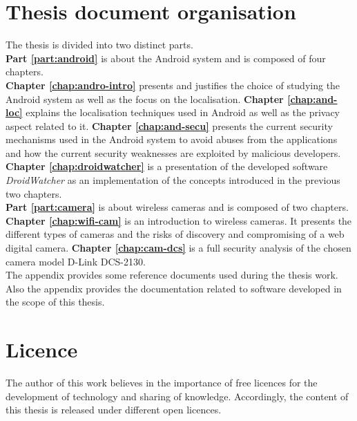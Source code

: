 \section{Thesis document organisation}

The thesis is divided into two distinct parts.\\

\textbf{Part \ref{part:android}} is about the Android system and is composed of four chapters.\\

\textbf{Chapter \ref{chap:andro-intro}} presents and justifies the choice of studying the Android system as well as the focus on the localisation.
\textbf{Chapter \ref{chap:and-loc}} explains the localisation techniques used in Android as well as the privacy aspect related to it.
\textbf{Chapter \ref{chap:and-secu}} presents the current security mechanisms used in the Android system to avoid abuses from the applications and how the current security weaknesses are exploited by malicious developers.
\textbf{Chapter \ref{chap:droidwatcher}} is a presentation of the developed software \emph{DroidWatcher} as an implementation of the concepts introduced in the previous two chapters.\\

\textbf{Part \ref{part:camera}} is about wireless cameras and is composed of two chapters.\\

\textbf{Chapter \ref{chap:wifi-cam}} is an introduction to wireless cameras.
It presents the different types of cameras and the risks of discovery and compromising of a web digital camera.
\textbf{Chapter \ref{chap:cam-dcs}} is a full security analysis of the chosen camera model D-Link DCS-2130.\\

The appendix provides some reference documents used during the thesis work.
Also the appendix provides the documentation related to software developed in the scope of this thesis.

\section{Licence}

The author of this work believes in the importance of free licences for the development of technology and sharing of knowledge.
Accordingly, the content of this thesis is released under different open licences.\\

